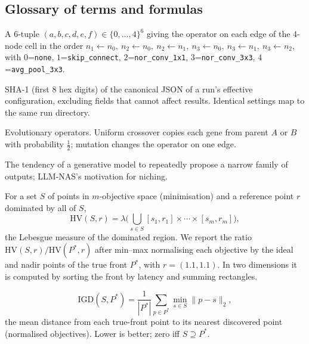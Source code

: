 \documentclass[pdflatex,sn-mathphys-ay]{sn-jnl}
\newcommand{\code}[1]{\texttt{#1}}
\newcommand{\HV}{\mathrm{HV}}
\newcommand{\IGD}{\mathrm{IGD}}
\begin{document}
\begin{appendices}
\section{Glossary of terms and formulas}\label{sec:glossary}
\begin{description}[style=nextline,leftmargin=0pt,itemsep=3pt]

\item[Architecture code (NB201).] A 6-tuple $(a,b,c,d,e,f)\in\{0,\dots,4\}^6$ giving the operator on each edge of the 4-node cell in the order $n_1{\leftarrow}n_0,\ n_2{\leftarrow}n_0,\ n_2{\leftarrow}n_1,\ n_3{\leftarrow}n_0,\ n_3{\leftarrow}n_1,\ n_3{\leftarrow}n_2$, with $0$=\code{none}, $1$=\code{skip\_connect}, $2$=\code{nor\_conv\_1x1}, $3$=\code{nor\_conv\_3x3}, $4$=\code{avg\_pool\_3x3}.

\item[Configuration hash.] SHA-1 (first 8 hex digits) of the canonical JSON of a run's effective configuration, excluding fields that cannot affect results. Identical settings map to the same run directory.

\item[Crossover / mutation.] Evolutionary operators. Uniform crossover copies each gene from parent $A$ or $B$ with probability $\tfrac12$; mutation changes the operator on one edge.

\item[Exploration bias / mode collapse.] The tendency of a generative model to repeatedly propose a narrow family of outputs; LLM-NAS's motivation for niching.

\item[Hypervolume (HV).] For a set $S$ of points in $m$-objective space (minimisation) and a reference point $r$ dominated by all of $S$,
\[
\HV(S,r)=\lambda\Big(\bigcup_{s\in S}[s_1,r_1]\times\cdots\times[s_m,r_m]\Big),
\]
the Lebesgue measure of the dominated region. We report the ratio $\HV(S,r)/\HV(P^\ast,r)$ after min--max normalising each objective by the ideal and nadir points of the true front $P^\ast$, with $r=(1.1,1.1)$. In two dimensions it is computed by sorting the front by latency and summing rectangles.

\item[Inverted generational distance (IGD).]
\[
\IGD(S,P^\ast)=\frac{1}{|P^\ast|}\sum_{p\in P^\ast}\min_{s\in S}\lVert p-s\rVert_2,
\]
the mean distance from each true-front point to its nearest discovered point (normalised objectives). Lower is better; zero iff $S\supseteq P^\ast$.


\end{description}
\end{appendices}
\end{document}
